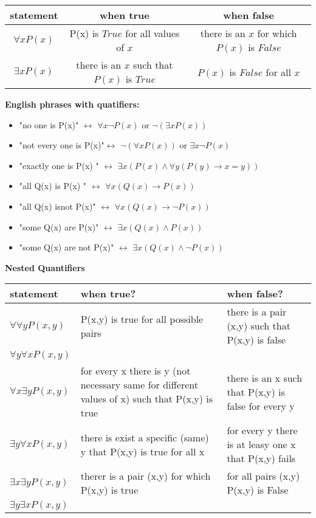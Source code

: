 \documentclass[a4paper]{article}
\begin{document}
\begin{tabular}{|c|c|c|}
    \hline
    statement & when true & when false \\ 
    \hline
    $\forall x P(x)$ & P(x) is $True$ for all values of $x$ & there is an $x$ for which $P(x)$ is $False$\\
    $\exists x P(x)$ & there is an $x$ such that $P(x)$ is $True$ & $P(x)$ is $False$ for all $x$ \\
    \hline
\end{tabular}
\newline\newline
\textbf{English phrases with quatifiers:}
\begin{itemize}
    \item "no one is P(x)" $\longleftrightarrow$ $\forall x \neg P(x)$ or $\neg(\exists x P(x))$
    \item "not every one is P(x)"$\longleftrightarrow$ $\neg(\forall x P(x))$ or $\exists x\neg P(x)$
    \item "exactly one is P(x) " $\longleftrightarrow$ $\exists x (P(x) \wedge \forall y (P(y) \rightarrow x = y)) $ 
    \item "all Q(x) is P(x) " $\longleftrightarrow$ $ \forall x (Q(x) \rightarrow P(x))$
    \item "all Q(x) isnot P(x)" $\longleftrightarrow$ $\forall x (Q(x)\rightarrow \neg P(x))$
    \item "some Q(x) are P(x)" $\longleftrightarrow$ $\exists x (Q(x)\wedge P(x))$
    \item "some Q(x) are not P(x)" $\longleftrightarrow$ $\exists x (Q(x)\wedge \neg P(x))$
\newline\newline
\end{itemize}

\noindent
\textbf{Nested Quantifiers}
\newline
\newline
\begin{tabular}{|p{2cm}|p{7cm}|p{7cm}|}
    \hline
    statement & when true? &when false? \\
    \hline
    $\forall \forall y P(x,y)$ & P(x,y) is true for all possible pairs & there is a pair (x,y) such that P(x,y) is false\\
    $\forall y \forall x P(x,y)$ & &\\
    \hline
    $\forall x \exists y P(x,y)$ & for every x there is y (not necessary same for different values of x) such that P(x,y) is true & there is an x such that P(x,y) is false for every y \\
    \hline
    $\exists y \forall x P(x,y)$ & there is exist a specific (same) y that P(x,y) is true for all x & for every y there is at leasy one  x that P(x,y) fails\\
    \hline
    $\exists x \exists y P(x,y)$ & therer is a pair (x,y) for which P(x,y) is true & for all pairs (x,y) P(x,y) is False\\
    $\exists y \exists x P(x,y) $&&\\
    \hline 
\end{tabular}
\end{document}
